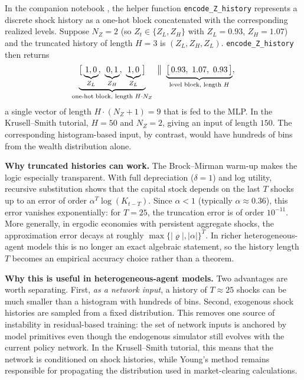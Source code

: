 \documentclass[11pt,a4paper]{report}
\begin{document}
\begin{remarkbox}
In the companion notebook , the helper function \texttt{encode\_Z\_history} represents a discrete shock history as a one-hot block concatenated with the corresponding realized levels.  Suppose $N_Z = 2$ (so $Z_t \in \{Z_L, Z_H\}$ with $Z_L = 0.93$, $Z_H = 1.07$) and the truncated history of length $H = 3$ is $(Z_L, Z_H, Z_L)$.  \texttt{encode\_Z\_history} then returns
\[
\underbrace{\bigl[\,\underbrace{1,0}_{Z_L},\ \underbrace{0,1}_{Z_H},\ \underbrace{1,0}_{Z_L}\,\bigr]}_{\text{one-hot block, length }H \cdot N_Z}
\;\bigm\Vert\;
\underbrace{\bigl[\,0.93,\ 1.07,\ 0.93\,\bigr]}_{\text{level block, length }H},
\]
a single vector of length $H \cdot (N_Z + 1) = 9$ that is fed to the MLP.  In the Krusell--Smith tutorial, $H = 50$ and $N_Z = 2$, giving an input of length $150$.  The corresponding histogram-based input, by contrast, would have hundreds of bins from the wealth distribution alone.
\end{remarkbox}

\medskip\noindent\textbf{Why truncated histories can work.}
The Brock--Mirman warm-up makes the logic especially transparent.  With full depreciation ($\delta = 1$) and log utility, recursive substitution shows that the capital stock depends on the last $T$ shocks up to an error of order $\alpha^T \log(K_{t-T})$.  Since $\alpha < 1$ (typically $\alpha \approx 0.36$), this error vanishes exponentially: for $T = 25$, the truncation error is of order $10^{-11}$.  More generally, in ergodic economies with persistent aggregate shocks, the approximation error decays at roughly $\max\{|\varrho|, |\alpha|\}^T$.  In richer heterogeneous-agent models this is no longer an exact algebraic statement, so the history length $T$ becomes an empirical accuracy choice rather than a theorem.

\medskip\noindent\textbf{Why this is useful in heterogeneous-agent models.}
Two advantages are worth separating.  First, \emph{as a network input}, a history of $T \approx 25$ shocks can be much smaller than a histogram with hundreds of bins.  Second, exogenous shock histories are sampled from a fixed distribution.  This removes one source of instability in residual-based training: the set of network inputs is anchored by model primitives even though the endogenous simulator still evolves with the current policy network.  In the Krusell--Smith tutorial, this means that the network is conditioned on shock histories, while Young's method remains responsible for propagating the distribution used in market-clearing calculations.
\end{document}
